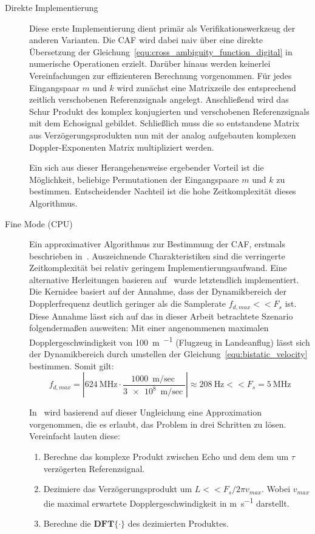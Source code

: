 \begin{description}
    \item[Direkte Implementierung]

          Diese erste Implementierung dient primär als Verifikationswerkzeug der anderen Varianten. Die CAF wird dabei naiv über eine direkte Übersetzung der Gleichung~\ref{equ:cross_ambiguity_function_digital} in numerische Operationen erzielt. Darüber hinaus werden keinerlei Vereinfachungen zur effizienteren Berechnung vorgenommen. Für jedes Eingangspaar \(m\) und \(k\) wird zunächst eine Matrixzeile des entsprechend zeitlich verschobenen Referenzsignals angelegt. Anschließend wird das Schur Produkt des komplex konjugierten und verschobenen Referenzsignals mit dem Echosignal gebildet. Schließlich muss die so entstandene Matrix aus Verzögerungsprodukten nun mit der analog aufgebauten komplexen Doppler-Exponenten Matrix multipliziert werden.

          Ein sich aus dieser Herangehensweise ergebender Vorteil ist die Möglichkeit, beliebige Permutationen der Eingangspaare \(m\) und \(k\) zu bestimmen. Entscheidender Nachteil ist die hohe Zeitkomplexität dieses Algorithmus.
    \item[Fine Mode (CPU)]

          Ein approximativer Algorithmus zur Bestimmung der CAF, erstmals beschrieben in~\cite{Stein1981}. Auszeichnende Charakteristiken sind die verringerte Zeitkomplexität bei relativ geringem Implementierungsaufwand. Eine alternative Herleitungen basieren auf~\cite{Yatrakis2001} wurde letztendlich implementiert. Die Kernidee basiert auf der Annahme, dass der Dynamikbereich der Dopplerfrequenz deutlich geringer als die Samplerate \(f_{d,max} << F_{s}\) ist. Diese Annahme lässt sich auf das in dieser Arbeit betrachtete Szenario folgendermaßen ausweiten: Mit einer angenommenen maximalen Dopplergeschwindigkeit von \SI{100}{\metre\per\sec} (Flugzeug in Landeanflug) lässt sich der Dynamikbereich durch umstellen der Gleichung~\ref{equ:bistatic_velocity} bestimmen. Somit gilt: %
          \begin{equation*}
              f_{d,max} = \left| \SI{624}{\mega\hertz} \cdot \frac{\SI{1000}{\metre\per\sec}}{\SI{3e8}{\metre\per\sec}} \right| \approx \SI{208}{\hertz} << F_s = \SI{5}{\mega\hertz} %
          \end{equation*}

          In~\cite{Yatrakis2001} wird basierend auf dieser Ungleichung eine Approximation vorgenommen, die es erlaubt, das Problem in drei Schritten zu lösen. Vereinfacht lauten diese:
          \begin{enumerate}
              \item Berechne das komplexe Produkt zwischen Echo und dem dem um \(\tau \) verzögerten Referenzsignal.
              \item Dezimiere das Verzögerungsprodukt um \(L << F_s / 2 \pi v_{max} \). Wobei \(v_{max}\) die maximal erwartete Dopplergeschwindigkeit in \si{\metre\per\second} darstellt. %
              \item Berechne die \(\mathbf{DFT} {\{ \cdot \}}\) des dezimierten Produktes.
          \end{enumerate}


\end{description}

